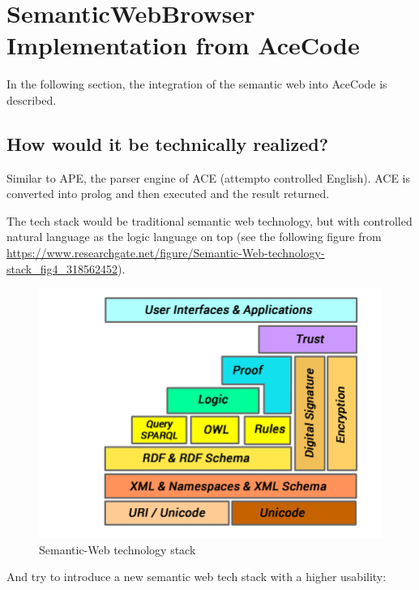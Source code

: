 \documentclass[12pt,a4paper]{article}
\begin{document}
\section{SemanticWebBrowser Implementation from AceCode}

In the following section, the integration of the semantic web into AceCode is described.

\subsection{How would it be technically realized?}

Similar to APE, the parser engine of ACE (attempto controlled English). ACE is converted into prolog and then executed and the result returned.

The tech stack would be traditional semantic web technology, but with controlled natural language as the logic language on top (see the following figure from \url{https://www.researchgate.net/figure/Semantic-Web-technology-stack_fig4_318562452}).

\begin{figure}[h]
    \includegraphics[width=12cm]{Semantic-Web-technology-stack}
    \caption{Semantic-Web technology stack}
\end{figure}

And try to introduce a new semantic web tech stack with a higher usability:
\end{document}
